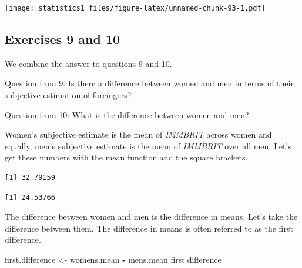\documentclass[]{book}
\newenvironment{Shaded}{\begin{snugshade}}{\end{snugshade}}
\newcommand{\KeywordTok}[1]{\textcolor[rgb]{0.13,0.29,0.53}{\textbf{#1}}}
\newcommand{\DecValTok}[1]{\textcolor[rgb]{0.00,0.00,0.81}{#1}}
\newcommand{\StringTok}[1]{\textcolor[rgb]{0.31,0.60,0.02}{#1}}
\newcommand{\OperatorTok}[1]{\textcolor[rgb]{0.81,0.36,0.00}{\textbf{#1}}}
\newcommand{\NormalTok}[1]{#1}
\theoremstyle{definition}
\theoremstyle{definition}
\theoremstyle{definition}
\theoremstyle{remark}
\begin{document}
\texttt{[image: statistics1\_files/figure-latex/unnamed-chunk-93-1.pdf]}

\subsection{Exercises 9 and 10}\label{exercises-9-and-10}

We combine the answer to questions 9 and 10.

Question from 9: Is there a difference between women and men in terms of
their subjective estimation of foreingers?

Question from 10: What is the difference between women and men?

Women's subjective estimate is the mean of \emph{IMMBRIT} across women
and equally, men's subjective estimate is the mean of \emph{IMMBRIT}
over all men. Let's get these numbers with the mean function and the
square brackets.

\begin{Shaded}
\end{Shaded}

\begin{verbatim}
[1] 32.79159
\end{verbatim}

\begin{Shaded}
\end{Shaded}

\begin{verbatim}
[1] 24.53766
\end{verbatim}

The difference between women and men is the difference in means. Let's
take the difference between them. The difference in means is often
referred to as the first difference.

\begin{Shaded}
\begin{Highlighting}[]
\NormalTok{first.difference <-}\StringTok{ }\NormalTok{womens.mean }\OperatorTok{-}\StringTok{ }\NormalTok{mens.mean}
\NormalTok{first.difference}
\end{Highlighting}
\end{Shaded}
\end{document}
